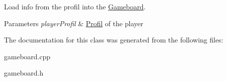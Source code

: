Load info from the profil into the \hyperlink{class_gameboard}{Gameboard}. 


\begin{DoxyParams}{Parameters}
{\em player\+Profil} & \hyperlink{class_profil}{Profil} of the player \\
\hline
\end{DoxyParams}


The documentation for this class was generated from the following files\+:\begin{DoxyCompactItemize}
\item 
gameboard.\+cpp\item 
gameboard.\+h\end{DoxyCompactItemize}
